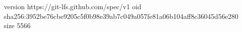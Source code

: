 version https://git-lfs.github.com/spec/v1
oid sha256:3952be76cbe9205c5f0b98e39ab7c049a057fe81a06b104aff8c36045d56e280
size 5566
